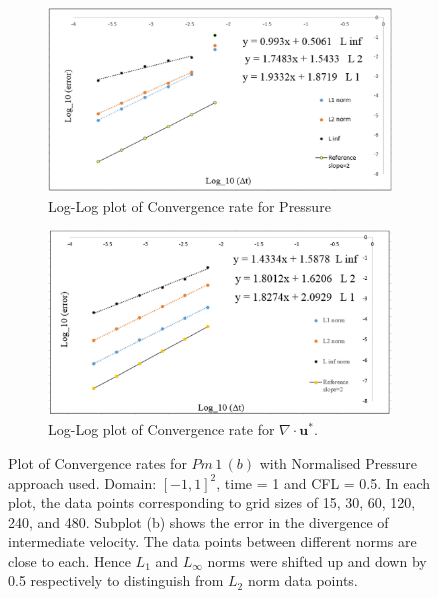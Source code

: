 \begin{figure}[H]
	\centering
	\begin{subfigure}[t]{4.5in}
		\centering
		\includegraphics[width=4.5in]{figures/Pm1b_pf2_np_P_rate_c_0_5.jpg}
		\caption{Log-Log plot of Convergence rate for Pressure}\label{fig:6.19a}		
	\end{subfigure}
	\quad
	\begin{subfigure}[t]{4.5in}
		\centering
		\includegraphics[width=4.5in]{figures/Pm1b_pf2_np_div_uv_rate_c_0_5.jpg}
		\caption{Log-Log plot of Convergence rate for $\nabla \cdot \textbf{u}^*$. }\label{fig:6.19b}
	\end{subfigure}
	\caption{Plot of Convergence rates for $Pm\,1\,(b)$ with Normalised Pressure approach used. Domain: $[-1,1]^2$, time = 1 and CFL = 0.5. In each plot, the data points corresponding to grid sizes of 15, 30, 60, 120, 240, and 480. Subplot (b) shows the error in the divergence of intermediate velocity. The data points between different norms are close to each. Hence $L_1$ and $L_\infty$ norms were shifted up and down by 0.5 respectively to distinguish from $L_2$ norm data points.}\label{fig:6.16}
\end{figure}

